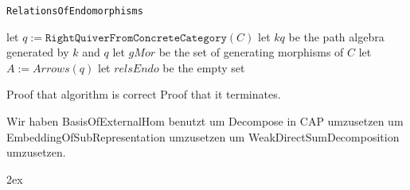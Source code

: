 \documentclass{article}
\theoremstyle{definition}
\begin{document}
\begin{algorithm}\capstart
    \caption{\texttt{RelationsOfEndomorphisms}}\label{algo:RelationsOfEndomorphisms}
	\BlankLine
	let $q := \texttt{RightQuiverFromConcreteCategory}(C)$\;
	let $kq$ be the path algebra generated by $k$ and $q$\;
	let $gMor$ be the set of generating morphisms of $C$\;
	let $A := Arrows(q)$\;
	let $relsEndo$ be the empty set\;
	\;
\end{algorithm}

Proof that algorithm is correct
Proof that it terminates.

Wir haben BasisOfExternalHom benutzt um Decompose in CAP umzusetzen um EmbeddingOfSubRepresentation umzusetzen um
WeakDirectSumDecomposition umzusetzen.

\begingroup
     \parindent 0pt
     \parskip 2ex
     \def\enotesize{\normalsize}
     \theendnotes
\endgroup 


\end{document}
